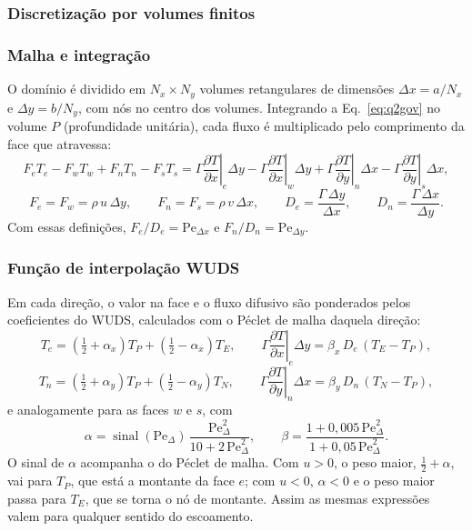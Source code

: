 \subsubsection*{Discretização por volumes finitos}

\subsubsection*{Malha e integração}

O domínio é dividido em $N_x\times N_y$ volumes retangulares de dimensões
$\Delta x=a/N_x$ e $\Delta y=b/N_y$, com nós no centro dos volumes. Integrando
a Eq.~\eqref{eq:q2gov} no volume $P$ (profundidade unitária), cada fluxo é
multiplicado pelo comprimento da face que atravessa:
\[
  F_eT_e-F_wT_w+F_nT_n-F_sT_s
  =\left.\Gamma\frac{\partial T}{\partial x}\right|_e\!\Delta y
  -\left.\Gamma\frac{\partial T}{\partial x}\right|_w\!\Delta y
  +\left.\Gamma\frac{\partial T}{\partial y}\right|_n\!\Delta x
  -\left.\Gamma\frac{\partial T}{\partial y}\right|_s\!\Delta x ,
\]
\[
  F_e=F_w=\rho\,u\,\Delta y,\qquad
  F_n=F_s=\rho\,v\,\Delta x,\qquad
  D_e=\frac{\Gamma\,\Delta y}{\Delta x},\qquad
  D_n=\frac{\Gamma\,\Delta x}{\Delta y}.
\]
Com essas definições, $F_e/D_e=\mathrm{Pe}_{\Delta x}$ e
$F_n/D_n=\mathrm{Pe}_{\Delta y}$.

\subsubsection*{Função de interpolação WUDS}

Em cada direção, o valor na face e o fluxo difusivo são ponderados pelos
coeficientes do WUDS, calculados com o Péclet de malha daquela direção:
\[
  T_e=\left(\tfrac12+\alpha_x\right)T_P+\left(\tfrac12-\alpha_x\right)T_E,
  \qquad
  \left.\Gamma\frac{\partial T}{\partial x}\right|_e\Delta y=\beta_x\,D_e\,(T_E-T_P),
\]
\[
  T_n=\left(\tfrac12+\alpha_y\right)T_P+\left(\tfrac12-\alpha_y\right)T_N,
  \qquad
  \left.\Gamma\frac{\partial T}{\partial y}\right|_n\Delta x=\beta_y\,D_n\,(T_N-T_P),
\]
e analogamente para as faces $w$ e $s$, com
\[
  \alpha=\operatorname{sinal}(\mathrm{Pe}_\Delta)\,
  \frac{\mathrm{Pe}_\Delta^{2}}{10+2\,\mathrm{Pe}_\Delta^{2}},\qquad
  \beta=\frac{1+0{,}005\,\mathrm{Pe}_\Delta^{2}}{1+0{,}05\,\mathrm{Pe}_\Delta^{2}} .
\]
O sinal de $\alpha$ acompanha o do Péclet de malha. Com $u>0$, o peso maior,
$\tfrac12+\alpha$, vai para $T_P$, que está a montante da face $e$; com
$u<0$, $\alpha<0$ e o peso maior passa para $T_E$, que se torna o nó de
montante. Assim as mesmas expressões valem para qualquer sentido do
escoamento.

